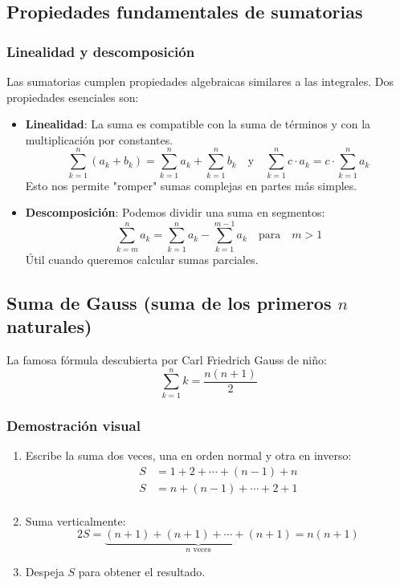 \documentclass[letterpaper, 12pt]{article}
\begin{document}
	\subsection{Propiedades fundamentales de sumatorias}
	
	\subsubsection{Linealidad y descomposición}
	
	Las sumatorias cumplen propiedades algebraicas similares a las integrales. Dos propiedades esenciales son:
	
	\begin{itemize}
		\item \textbf{Linealidad}: La suma es compatible con la suma de términos y con la multiplicación por constantes.
		\[
		\sum_{k=1}^n (a_k + b_k) = \sum_{k=1}^n a_k + \sum_{k=1}^n b_k \quad \text{y} \quad \sum_{k=1}^n c \cdot a_k = c \cdot \sum_{k=1}^n a_k
		\]
		Esto nos permite "romper" sumas complejas en partes más simples.
		
		\item \textbf{Descomposición}: Podemos dividir una suma en segmentos:
		\[
		\sum_{k=m}^n a_k = \sum_{k=1}^n a_k - \sum_{k=1}^{m-1} a_k \quad \text{para} \quad m > 1
		\]
		Útil cuando queremos calcular sumas parciales.
	\end{itemize}
	
	\subsection{Suma de Gauss (suma de los primeros $n$ naturales)}
	
	La famosa fórmula descubierta por Carl Friedrich Gauss de niño:
	\[
	\sum_{k=1}^n k = \frac{n(n+1)}{2}
	\]
	
	\subsubsection{Demostración visual}
	
	\begin{enumerate}
		\item Escribe la suma dos veces, una en orden normal y otra en inverso:
		\[
		\begin{aligned}
			S &= 1 + 2 + \cdots + (n-1) + n \\
			S &= n + (n-1) + \cdots + 2 + 1 \\
		\end{aligned}
		\]
		
		\item Suma verticalmente:
		\[
		2S = \underbrace{(n+1) + (n+1) + \cdots + (n+1)}_{n \text{ veces}} = n(n+1)
		\]
		
		\item Despeja $S$ para obtener el resultado.
	\end{enumerate}
	
\end{document}
